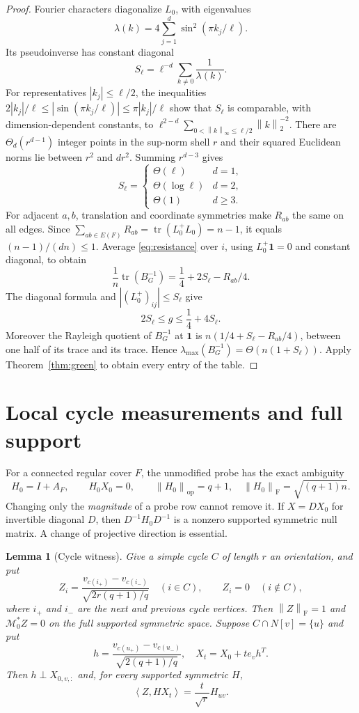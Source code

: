 \documentclass[11pt]{article}
\newtheorem{lemma}[theorem]{Lemma}
\theoremstyle{remark}\newtheorem{remark}[theorem]{Remark}
\newcommand{\one}{\mathbf 1}
\newcommand{\op}{\mathrm{op}}
\newcommand{\F}{\mathrm F}
\newcommand{\M}{\mathcal M}
\newcommand{\tr}{\operatorname{tr}}
\newcommand{\norm}[1]{\left\lVert #1\right\rVert}
\newcommand{\ip}[2]{\left\langle #1,#2\right\rangle}
\begin{document}
\begin{proof}
Fourier characters diagonalize $L_0$, with eigenvalues
\[
\lambda(k)=4\sum_{j=1}^d\sin^2(\pi k_j/\ell).
\]
Its pseudoinverse has constant diagonal
\[
S_\ell=\ell^{-d}\sum_{k\ne0}\frac1{\lambda(k)}.
\]
For representatives $|k_j|\leq\ell/2$, the inequalities
$2|k_j|/\ell\leq|\sin(\pi k_j/\ell)|\leq\pi|k_j|/\ell$ show that
$S_\ell$ is comparable, with dimension-dependent constants, to
$\ell^{2-d}\sum_{0<\norm k_\infty\leq\ell/2}\norm k_2^{-2}$.
There are $\Theta_d(r^{d-1})$ integer points in the sup-norm shell $r$ and their squared Euclidean norms lie between $r^2$ and $dr^2$. Summing $r^{d-3}$ gives
\[
S_\ell=\begin{cases}\Theta(\ell)&d=1,\\\Theta(\log\ell)&d=2,\\\Theta(1)&d\geq3.\end{cases}
\]
For adjacent $a,b$, translation and coordinate symmetries make $R_{ab}$ the same on all edges. Since
$\sum_{ab\in E(F)}R_{ab}=\tr(L_0^+L_0)=n-1$, it equals $(n-1)/(dn)\leq1$.
Average \eqref{eq:resistance} over $i$, using $L_0^+\one=0$ and constant diagonal, to obtain
\[
\frac1n\tr(B_G^{-1})=\frac14+2S_\ell-R_{ab}/4.
\]
The diagonal formula and $|(L_0^+)_{ij}|\leq S_\ell$ give
\begin{equation}\label{eq:torusg}
2S_\ell\leq g\leq\frac14+4S_\ell.
\end{equation}
Moreover the Rayleigh quotient of $B_G^{-1}$ at $\one$ is
$n(1/4+S_\ell-R_{ab}/4)$, between one half of its trace and its trace. Hence
$\lambda_{\max}(B_G^{-1})=\Theta(n(1+S_\ell))$.
Apply Theorem~\ref{thm:green} to obtain every entry of the table.
\end{proof}

\section{Local cycle measurements and full support}\label{sec:full}

For a connected regular cover $F$, the unmodified probe has the exact ambiguity
\[
H_0=I+A_F,\qquad H_0X_0=0,\qquad\norm{H_0}_{\op}=q+1,
\quad\norm{H_0}_{\F}=\sqrt{(q+1)n}.
\]
Changing only the \emph{magnitude} of a probe row cannot remove it. If $X=DX_0$ for invertible diagonal $D$, then $D^{-1}H_0D^{-1}$ is a nonzero supported symmetric null matrix. A change of projective direction is essential.

\begin{lemma}[Cycle witness]\label{lem:cycle}
Give a simple cycle $C$ of length $r$ an orientation, and put
\[
Z_i=\frac{v_{c(i_+)}-v_{c(i_-)}}{\sqrt{2r(q+1)/q}}\quad(i\in C),\qquad Z_i=0\quad(i\notin C),
\]
where $i_+$ and $i_-$ are the next and previous cycle vertices. Then $\norm Z_{\F}=1$ and $\M_0^*Z=0$ on the full supported symmetric space. Suppose $C\cap N[v]=\{u\}$ and put
\[
h=\frac{v_{c(u_+)}-v_{c(u_-)}}{\sqrt{2(q+1)/q}},\quad
X_t=X_0+t e_vh^T.
\]
Then $h\perp X_{0,v,:}$ and, for every supported symmetric $H$,
\begin{equation}\label{eq:anchor}
\ip Z{HX_t}=\frac{t}{\sqrt r}H_{uv}.
\end{equation}
\end{lemma}
\end{document}
